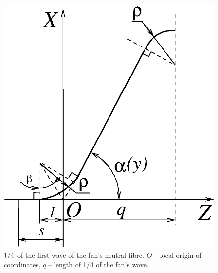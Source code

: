 \begin{figure}
\centering
\includegraphics{bqwave.eps}
\caption{$1/4\/$ of the first wave of the fan's neutral fibre. $O$ -- local
origin of coordinates, $q$ -- length of 1/4 of the fan's wave.}
\label{bqwave}
\end{figure}
